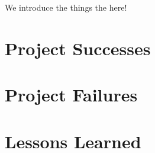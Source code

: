 
We introduce the things the here!

\section{Project Successes}

\section{Project Failures}

\section{Lessons Learned}
